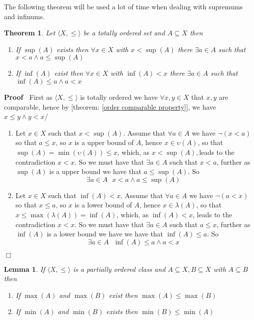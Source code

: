 \documentclass{book}
\newenvironment{proof}{\noindent\textbf{Proof\ }}{\hspace*{\fill}$\Box$\medskip}
\newtheorem{lemma}{Lemma}
\newtheorem{theorem}{Theorem}
\begin{document}
The following theorem will be used a lot of time when dealing with supremums
and infinums.

\begin{theorem}
  \label{order sup, inf property}Let $\langle X, \leqslant \rangle$ be a
  totally ordered set and $A \subseteq X$ then
  \begin{enumerate}
    \item If $\sup (A)$ exists then $\forall x \in X$ with $x < \sup (A)$
    there $\exists a \in A$ such that $x < a \wedge a \leqslant \sup (A)$
    
    \item If $\inf (A)$ exist then $\forall x \in X$ with $\inf (A) < x$ there
    $\exists a \in A$ such that $\inf (A) \leqslant a \wedge a < x$
  \end{enumerate}
\end{theorem}

\begin{proof}
  First as $\langle X, \leqslant \rangle$ is totally ordered we have $\forall
  x, y \in X$ that $x, y$ are comparable, hence by [theorem: \ref{order
  comparable property}], we have $x \leqslant y \wedge y < x$/
  \begin{enumerate}
    \item Let $x \in X$ such that $x < \sup (A)$. Assume that $\forall a \in
    A$ we have $\neg (x < a)$ so that $a \leqslant x$, so $x$ is a upper bound
    of $A$, hence $x \in \upsilon (A)$, so that $\sup (A) = \min (\upsilon
    (A)) \leqslant x$, which, as $x < \sup (A),$leads to the contradiction $x
    < x$. So we must have that $\exists a \in A$ such that $x < a$, further as
    $\sup (A)$ is a upper bound we have that $a \leqslant \sup (A)$. So
    \[ \exists a \in A \text{ } x < a \wedge a \leqslant \sup (A) \]
    \item Let $x \in X$ such that $\inf (A) < x$. Assume that $\forall a \in
    A$ we have $\neg (a < x)$ so that $x \leqslant a$, so $x$ is a lower bound
    of $A$, hence $x \in \lambda (A)$, so that $x \leqslant \max (\lambda (A))
    = \inf (A)$, which, as $\inf (A) < x$, leads to the contradiction $x < x$.
    So we must have that $\exists a \in A$ such that $a \leqslant x$, further
    as $\inf (A)$ is a lower bound we have we have that $\inf (A) \leqslant
    a$. So
    \[ \exists a \in A \text{ } \inf (A) \leqslant a \wedge a < x \]
  \end{enumerate}
\end{proof}

\begin{lemma}
  \label{order inclusion and greatest and least element}If $\langle X,
  \leqslant \rangle$ is a partially ordered class and $A \subseteq X, B
  \subseteq X$ with $A \subseteq B$ then
  \begin{enumerate}
    \item If $\max (A)$ and $\max (B)$ exist then $\max (A) \leqslant \max
    (B)$
    
    \item If $\min (A)$ and $\min (B)$ exists then $\min (B) \leqslant \min
    (A)$
  \end{enumerate}
\end{lemma}
\end{document}
